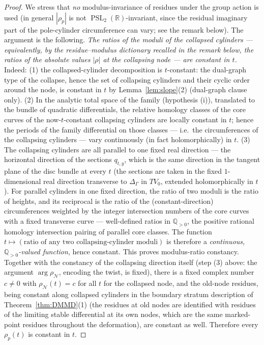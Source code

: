 \documentclass[11pt]{article}
\newcommand{\R}{\mathbb{R}}
\DeclareMathOperator{\PSL}{PSL}
\theoremstyle{definition}
\theoremstyle{remark}
\begin{document}
\begin{proof}
We stress that \emph{no} modulus-invariance of residues under the
group action is used (in general $|\rho_p|$ is not
$\PSL_2(\R)$-invariant, since the residual imaginary part of the
pole-cylinder circumference can vary; see the remark below). The
argument is the
following. \emph{The ratios of the moduli of the collapsed cylinders
--- equivalently, by the residue--modulus dictionary recalled in the
remark below, the ratios of the absolute values $|\rho|$ at the
collapsing node --- are constant in $t$.} Indeed: (1) the
collapsed-cylinder decomposition is $t$-constant: the dual-graph type
of the collapse, hence the set of collapsing cylinders and their
cyclic order around the node, is constant in $t$ by
Lemma~\ref{lem:slope}(2) (dual-graph clause only). (2) In the
analytic total space of the family (hypothesis (i)), translated to
the bundle of quadratic differentials, the relative homology classes
of the core curves of the now-$t$-constant collapsing cylinders are
locally constant in $t$; hence the periods of the family differential
on those classes --- i.e.\ the circumferences of the collapsing
cylinders --- vary continuously (in fact holomorphically) in $t$.
(3) The collapsing cylinders are all parallel to one fixed real
direction --- the horizontal direction of the sections $q_{t,y}$,
which is the same direction in the tangent plane of the disc bundle
at every $t$ (the sections are taken in the fixed $1$-dimensional
real direction transverse to $\Delta_\Gamma$ in $T V_0$, extended
holomorphically in $t$). For parallel cylinders in one fixed
direction, the ratio of two moduli is the ratio of heights, and its
reciprocal is the ratio of the (constant-direction) circumferences
weighted by the integer intersection numbers of the core curves with
a fixed transverse curve --- well-defined ratios in
$\mathbb{Q}_{>0}$, the positive rational homology intersection
pairing of parallel core classes. The function
$t \mapsto (\text{ratio of any two collapsing-cylinder moduli})$ is
therefore a \emph{continuous, $\mathbb{Q}_{>0}$-valued function},
hence constant. This proves modulus-ratio constancy. Together with
the constancy of the collapsing direction itself (step (3) above:
the argument $\arg \rho_{\mathcal N}$, encoding the twist, is fixed),
there is a fixed complex number $c \neq 0$ with
$\rho_{\mathcal N}(t) = c$ for all $t$ for the collapsed node, and the
old-node residues, being constant along collapsed cylinders in the
boundary stratum description of Theorem~\ref{thm:DMMD}(1) (the residues
at old nodes are identified with residues of the limiting stable
differential at its own nodes, which are the same marked-point residues
throughout the deformation), are constant as well. Therefore every
$\rho_p(t)$ is constant in $t$.
\end{proof}
\end{document}
